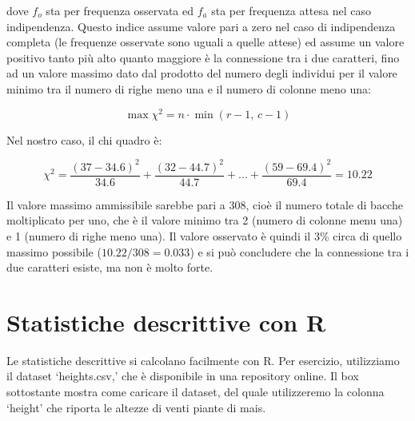 \documentclass[a4paper,12pt,oneside]{book}
\newenvironment{Shaded}{\begin{snugshade}}{\end{snugshade}}
\newcommand{\SpecialCharTok}[1]{#1}
\newcommand{\StringTok}[1]{#1}
\newcommand{\DocumentationTok}[1]{#1}
\newcommand{\OtherTok}[1]{#1}
\newcommand{\FunctionTok}[1]{#1}
\newcommand{\AttributeTok}[1]{#1}
\newcommand{\NormalTok}[1]{#1}
\begin{document}
dove \(f_o\) sta per frequenza osservata ed \(f_a\) sta per frequenza attesa nel caso indipendenza. Questo indice assume valore pari a zero nel caso di indipendenza completa (le frequenze osservate sono uguali a quelle attese) ed assume un valore positivo tanto più alto quanto maggiore è la connessione tra i due caratteri, fino ad un valore massimo dato dal prodotto del numero degli individui per il valore minimo tra il numero di righe meno una e il numero di colonne meno una:

\[\max \chi ^2  = n \cdot \min (r - 1,\,c - 1)\]

Nel nostro caso, il chi quadro è:

\[\chi ^2  = \frac{\left( {37  - 34.6 } \right)^2 }{34.6 } + \frac{\left( {32  - 44.7 } \right)^2 }{44.7 } + ... + \frac{\left( {59  - 69.4 } \right)^2 }{69.4 } = 10.22\]

Il valore massimo ammissibile sarebbe pari a 308, cioè il numero totale di bacche moltiplicato per uno, che è il valore minimo tra 2 (numero di colonne menu una) e 1 (numero di righe meno una). Il valore osservato è quindi il 3\% circa di quello massimo possibile (\(10.22/308=0.033\)) e si può concludere che la connessione tra i due caratteri esiste, ma non è molto forte.

\hypertarget{statistiche-descrittive-con-r}{%
\section{Statistiche descrittive con R}\label{statistiche-descrittive-con-r}}

Le statistiche descrittive si calcolano facilmente con R. Per esercizio, utilizziamo il dataset `heights.csv,' che è disponibile in una repository online. Il box sottostante mostra come caricare il dataset, del quale utilizzeremo la colonna `height' che riporta le altezze di venti piante di mais.

\begin{Shaded}
\end{Shaded}
\end{document}
